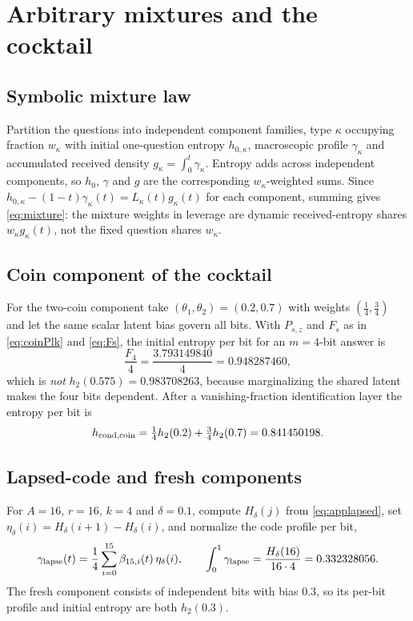 \section{Arbitrary mixtures and the cocktail}\label{app:mixtures}

\subsection{Symbolic mixture law}

Partition the questions into independent component families, type
$\kappa$ occupying fraction $w_\kappa$ with initial one-question
entropy $h_{0,\kappa}$, macroscopic profile $\gamma_\kappa$ and
accumulated received density $g_\kappa = \int_0^t\gamma_\kappa$.
Entropy adds across independent components, so $h_0$, $\gamma$ and
$g$ are the corresponding $w_\kappa$-weighted sums. Since
$h_{0,\kappa}-(1-t)\gamma_\kappa(t) = L_\kappa(t)g_\kappa(t)$ for
each component, summing gives \eqref{eq:mixture}: the mixture weights
in leverage are dynamic received-entropy shares
$w_\kappa g_\kappa(t)$, not the fixed question shares $w_\kappa$.

\subsection{Coin component of the cocktail}

For the two-coin component take $(\theta_1,\theta_2) = (0.2,0.7)$
with weights $(\tfrac14,\tfrac34)$ and let the same scalar latent
bias govern all bits. With $P_{s,z}$ and $F_s$ as in
\eqref{eq:coinPlk} and \eqref{eq:Fs}, the initial entropy per bit for
an $m = 4$-bit answer is
%
\begin{equation}
  \frac{F_4}{4} = \frac{3.793149840}{4} = 0.948287460,
  \label{eq:appcoinF4}
\end{equation}
%
which is \emph{not} $h_2(0.575) = 0.983708263$, because marginalizing
the shared latent makes the four bits dependent. After a
vanishing-fraction identification layer the entropy per bit is
%
\begin{equation}
  h_{\rm cond,coin}
  = \tfrac14 h_2(0.2) + \tfrac34 h_2(0.7) = 0.841450198 .
  \label{eq:appcoincond}
\end{equation}

\subsection{Lapsed-code and fresh components}

For $A = 16$, $r = 16$, $k = 4$ and $\delta = 0.1$, compute
$H_\delta(j)$ from \eqref{eq:applapsed}, set
$\eta_\delta(i) = H_\delta(i+1)-H_\delta(i)$, and normalize the code
profile per bit,
%
\begin{equation}
  \gamma_{\rm lapse}(t)
  = \frac14\sum_{i=0}^{15}\beta_{15,i}(t)\,\eta_\delta(i),
  \qquad
  \int_0^1\gamma_{\rm lapse}
  = \frac{H_\delta(16)}{16\cdot4} = 0.332328056 .
  \label{eq:applapseprofile}
\end{equation}
%
The fresh component consists of independent bits with bias $0.3$, so
its per-bit profile and initial entropy are both $h_2(0.3)$.

